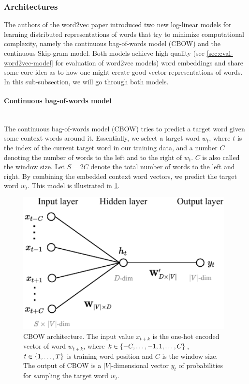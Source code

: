 \subsubsection{Architectures}
The authors of the word2vec paper introduced two new log-linear models for learning distributed representations of words that try to minimize computational complexity, namely the continuous bag-of-words model (CBOW) and the continuous Skip-gram model. Both models achieve high quality (see \cref{sec:eval-word2vec-model} for evaluation of word2vec models) word embeddings and share some core idea as to how one might create good vector representations of words. In this sub-subsection, we will go through both models.

\paragraph*{Continuous bag-of-words model}\mbox{} \\
The continuous bag-of-words model (CBOW) tries to predict a target word given some context words around it. Essentially, we select a target word $w_t$, where $t$ is the index of the current target word in our training data, and a number $C$ denoting the number of words to the left and to the right of $w_t$. $C$ is also called the window size. Let $S=2C$ denote the total number of words to the left and right. By combining the embedded context word vectors, we predict the target word $w_t$. This model is illustrated in \cref{fig:cbow-model}.

\begin{figure}[H]
    \centering
    \includegraphics[width=11cm]{thesis/figures/cbow_cropped.pdf}
    \caption{CBOW architecture. The input value $x_{t+k}$ is the one-hot encoded vector of word $w_{t+k}$, where $k \in \left\{-C, \ldots, -1, 1, \ldots, C\right\}$, $t \in \left\{1, \ldots, T\right\}$ is training word position and $C$ is the window size. The output of CBOW is a $|V|$-dimensional vector $y_t$ of probabilities for sampling the target word $w_t$.}
    \label{fig:cbow-model}
\end{figure}

